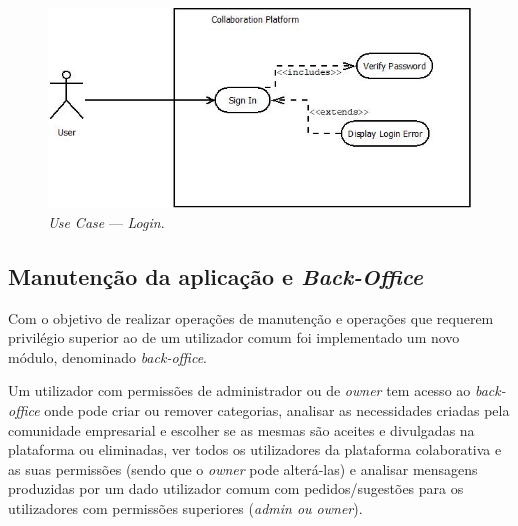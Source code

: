 \begin{figure}[H]
    \centering
    \includegraphics[scale=0.6]{figures/Login Use Case.jpeg}
    \caption{\textit{Use Case} --- \textit{Login}.}\label{fig:uc:login}
\end{figure}

\newpage

\subsection{Manutenção da aplicação e \textit{Back-Office}}\label{subsec:manutencao_e_back-office}

Com o objetivo de realizar operações de manutenção e operações que requerem privilégio superior ao de um utilizador comum foi implementado um novo módulo, denominado \textit{back-office}. 

\par 
Um utilizador com permissões de administrador ou de \textit{owner} tem acesso ao \textit{back-office} onde pode criar ou remover categorias, analisar as necessidades criadas pela comunidade empresarial e escolher se as mesmas são aceites e divulgadas na plataforma ou eliminadas,
ver todos os utilizadores da plataforma colaborativa e as suas permissões (sendo que o \textit{owner} pode alterá-las) e analisar mensagens produzidas por um dado utilizador comum com pedidos/sugestões para os utilizadores com permissões superiores (\textit{admin ou owner}).  

